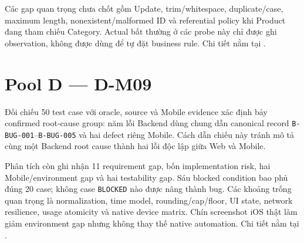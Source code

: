 Các gap quan trọng chưa chốt gồm Update, trim/whitespace, duplicate/case,
maximum length, nonexistent/malformed ID và referential policy khi Product đang
tham chiếu Category. Actual bất thường ở các probe này chỉ được ghi observation,
không được dùng để tự đặt business rule. Chi tiết nằm tại
.

\section{Pool D --- D-M09}

Đối chiếu 50 test case với oracle, source và Mobile evidence xác định bảy
confirmed root-cause group: năm lỗi Backend dùng chung dẫn canonical record
\texttt{B-BUG-001}--\texttt{B-BUG-005} và hai defect riêng Mobile. Cách dẫn
chiếu này tránh mô tả cùng một Backend root cause thành hai lỗi độc lập giữa Web
và Mobile.

Phân tích còn ghi nhận 11 requirement gap, bốn implementation risk, hai
Mobile/environment gap và hai testability gap. Sáu blocked condition bao phủ
đúng 20 case; không case \texttt{BLOCKED} nào được nâng thành bug. Các khoảng
trống quan trọng là normalization, time model, rounding/cap/floor, UI state,
network resilience, usage atomicity và native device matrix. Chín screenshot
iOS thật làm giảm environment gap nhưng không thay thế native automation. Chi tiết nằm tại
.

